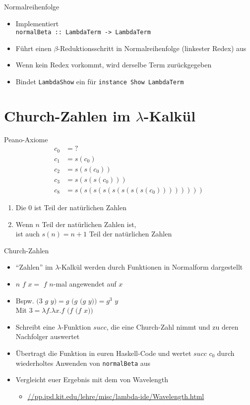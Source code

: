 \documentclass{beamer}
\newcommand{\code}[1]{
	\begin{mdframed}
		
	\end{mdframed}
}
\begin{document}
\begin{frame}{Normalreihenfolge}
	\code{demos/LambdaN.hs}
	\begin{itemize}
		\item Implementiert\\
		      \texttt{normalBeta :: LambdaTerm -> LambdaTerm}
	        \item Führt einen $\beta$-Reduktionsschritt in Normalreihenfolge (linkester Redex) aus
		\item Wenn kein Redex vorkommt, wird derselbe Term zurückgegeben
		\item Bindet \texttt{LambdaShow} ein für \texttt{instance Show LambdaTerm}
	\end{itemize}
\end{frame}

\section{Church-Zahlen im $\lambda$-Kalkül}

\begin{frame}{Peano-Axiome}
	\begin{eqnarray*}
		c_0 &= ?\\
		c_1 &= s (c_0)\\
		c_2 &= s (s (c_0))\\
		c_3 &= s (s (s (c_0)))\\
		c_8 &= s (s (s (s (s (s (s (s (c_0))))))))
	\end{eqnarray*}

	\begin{enumerate}
		\item Die 0 ist Teil der natürlichen Zahlen
		\item Wenn $n$ Teil der natürlichen Zahlen ist,\\
	 	      ist auch $s(n) = n + 1$ Teil der natürlichen Zahlen
	\end{enumerate}
\end{frame}

\begin{frame}{Church-Zahlen}
	\begin{itemize}
		\item \enquote{Zahlen} im $\lambda$-Kalkül werden durch Funktionen in Normalform dargestellt
		\item $n$ $f$ $x =$ $f$ $n$-mal angewendet auf $x$
		\item Bspw. $(3$ $g$ $y) = g$ $(g $ $(g$ $y)) = g^3$ $y$\\
		      Mit $3 = \lambda{}f.\lambda{}x.f$ $(f $ $(f$ $x))$
		\item Schreibt eine $\lambda$-Funktion $succ$, die eine Church-Zahl nimmt und zu deren Nachfolger auswertet
		\pause
		\item Übertragt die Funktion in euren Haskell-Code und wertet $succ$ $c_0$ durch wiederholtes Anwenden von \texttt{normalBeta} aus
		\item Vergleicht euer Ergebnis mit dem von Wavelength
		\begin{itemize}
			\item \url{//pp.ipd.kit.edu/lehre/misc/lambda-ide/Wavelength.html}
		\end{itemize}
	\end{itemize}
\end{frame}
\end{document}
